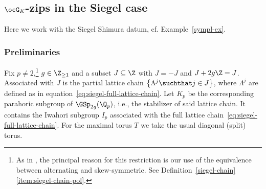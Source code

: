 \documentclass[a4paper]{scrartcl} %
\numberwithin{equation}{section}
\begin{document}
\subsection{\texorpdfstring{$\ocG_K$}{GK}-zips in the Siegel case}
\label{sec:G_K-zips}

Here we work with the Siegel Shimura datum, cf. Example~\ref{sympl-ex}.

\subsubsection{Preliminaries}

\begin{Notation}
  Fix $p\ne 2$,\footnote{As in \cite{rz}, the principal reason for this restriction is our use of the equivalence between alternating and skew-symmetric. See Definition~\ref{siegel-chain}\,\eqref{item:siegel-chain-pol}.} $g\in\Z_{\geq 1}$ and a subset $J\subseteq \Z$ with $J=-J$ and $J+2g\Z=J$. Associated with $J$ is the partial lattice chain $\left\{\Lambda^j \suchthat j\in J\right\}$, where $\Lambda^j$ are defined as in equation~\eqref{eq:siegel-full-lattice-chain}. Let $K_p$ be the corresponding parahoric subgroup of $\GSp_{2g}(\Q_p)$, i.e., the stabilizer of said lattice chain. It contains the Iwahori subgroup $I_p$ associated with the full lattice chain~\eqref{eq:siegel-full-lattice-chain}. For the maximal torus $T$ we take the usual diagonal (split) torus.
\end{Notation}
\end{document}
